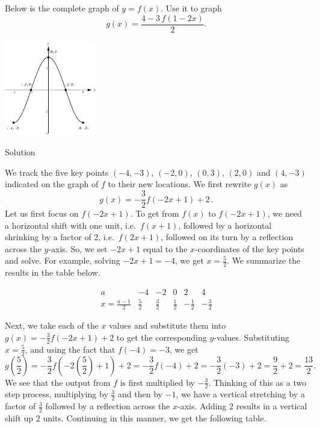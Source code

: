 \begin{example}
 Below is the complete graph of $y = f(x)$.  Use it to graph 
 $$g(x) = \dfrac{4-3\,f(1-2x)}{2}.$$


	\begin{center}
			\includegraphics[width=0.3\textwidth]{fig_functions_28}
	\end{center}

Solution 

We track the five key points $(-4,-3)$, $(-2,0)$, $(0,3)$, $(2,0)$ and $(4,-3)$ indicated on the graph of $f$ to their new locations.  We first rewrite $g(x)$ as
 $$g(x) = -\frac{3}{2}f(-2x+1) +2\,.$$
Let us first focus on $f(-2x+1)$. To get from $f(x)$ to $f(-2x+1)$, we need a horizontal shift with one unit, i.e.\ $f(x+1)$, followed by a horizontal shrinking by a factor of 2, i.e.\ $f(2x+1)$, followed on its turn by a reflection across the $y$-axis. So,  we set $-2x+1$ equal to the $x$-coordinates of the key points and solve.  For example, solving $-2x+1 = -4$, we get $x = \frac{5}{2}$.  We summarize the results in the table below. 

\renewcommand{\arraystretch}{1.5}
\[  \begin{array}{c|ccccc}  

a &-4&-2&0&2&4\\\hline
x = \frac{a-1}{2}&\frac{5}{2}&\frac{3}{2}&\frac{1}{2}&-\frac{1}{2}&-\frac{3}{2}
\end{array} \]
\renewcommand{\arraystretch}{1}


Next, we take each of the $x$ values and substitute them into $g(x) = -\frac{3}{2}f(-2x+1) +2$ to get the corresponding $y$-values.  Substituting  $x=\frac{5}{2}$, and using the fact that $f(-4)=-3$, we get \[g\left(\frac{5}{2}\right) = -\frac{3}{2}f\left(-2\left(\frac{5}{2}\right) +1\right) +2 = -\frac{3}{2} f(-4) + 2 = -\frac{3}{2}(-3) + 2 = \frac{9}{2} + 2 = \frac{13}{2}.\] 
We see that the output from $f$ is first multiplied by $-\tfrac{3}{2}$.  Thinking of this as a two step process, multiplying by $\tfrac{3}{2}$ and then by $-1$, we have  a vertical stretching by a factor of $\tfrac{3}{2}$ followed by a reflection across the $x$-axis.  Adding $2$ results in a vertical shift up $2$ units.  Continuing in this manner, we get the following table.


\end{example}
